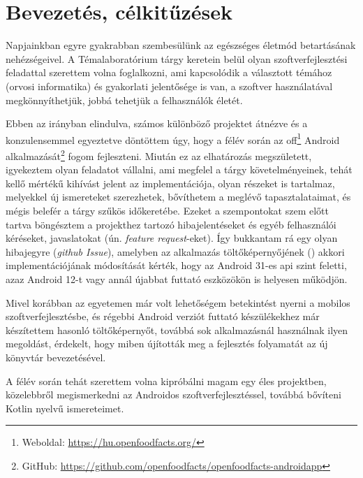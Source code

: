 \chapter{Bevezetés, célkitűzések}
Napjainkban egyre gyakrabban szembesülünk az egészséges életmód betartásának nehézségeivel.
A Témalaboratórium tárgy keretein belül olyan szoftverfejlesztési feladattal szerettem volna
foglalkozni, ami kapcsolódik a választott témához (orvosi informatika) és gyakorlati
jelentősége is van, a szoftver használatával megkönnyíthetjük, jobbá tehetjük a felhasználók életét.

Ebben az irányban elindulva, számos különböző projektet átnézve és a konzulensemmel egyeztetve
döntöttem úgy, hogy a félév során az \acrlong{off}\footnote{Weboldal: \url{https://hu.openfoodfacts.org/}}
Android alkalmazását\footnote{GitHub: \url{https://github.com/openfoodfacts/openfoodfacts-androidapp}} fogom fejleszteni.
Miután ez az elhatározás megszületett, igyekeztem olyan feladatot vállalni,
ami megfelel a tárgy követelményeinek, tehát kellő mértékű kihívást jelent
az implementációja, olyan részeket is tartalmaz, melyekkel új ismereteket szerezhetek, bővíthetem a meglévő tapasztalataimat, és mégis
belefér a tárgy szűkös időkeretébe. Ezeket a szempontokat szem előtt tartva böngésztem a
projekthez tartozó hibajelentéseket és egyéb felhasználói kéréseket, javaslatokat (ún. \textit{feature request}-eket).
Így bukkantam rá egy olyan hibajegyre (\textit{\gls{github} Issue}), amelyben az alkalmazás
töltőképernyőjének () akkori implementációjának módosítását kérték, hogy
az Android 31-es \acrshort{api} szint feletti, azaz Android 12-t vagy annál újabbat futtató eszközökön
is helyesen működjön. \cite{issue}

Mivel korábban az egyetemen már volt lehetőségem betekintést nyerni a mobilos szoftverfejlesztésbe,
és régebbi Android verziót futtató készülékekhez már készítettem hasonló töltőképernyőt, továbbá
sok alkalmazásnál használnak ilyen megoldást, érdekelt, hogy miben újították meg a fejlesztés
folyamatát az új könyvtár bevezetésével.

A félév során tehát szerettem volna kipróbálni magam egy éles projektben, közelebbről megismerkedni
az Androidos szoftverfejlesztéssel, továbbá bővíteni Kotlin nyelvű ismereteimet.
